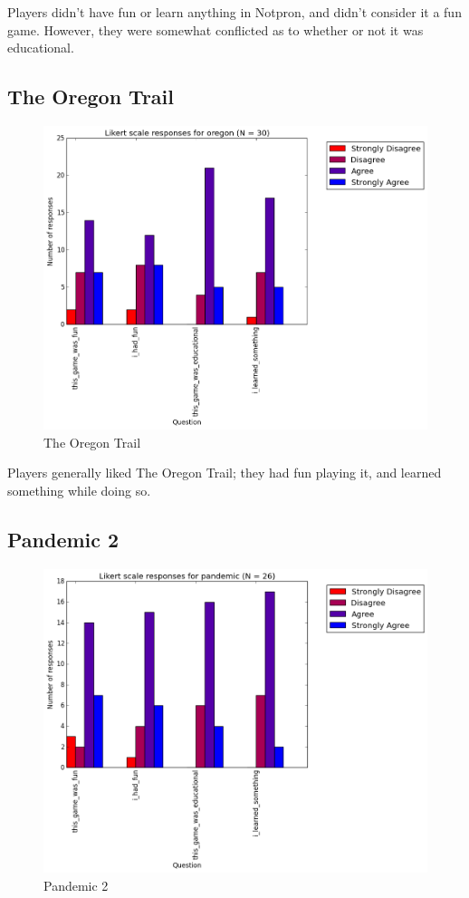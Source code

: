 				Players didn't have fun or learn anything in Notpron, and didn't consider it a fun game. However, they were somewhat conflicted as to whether or not it was educational.

			\subsection{The Oregon Trail}

				\begin{figure}[] 
				\centering 
				\includegraphics[width=\textwidth, height=.4\textheight, keepaspectratio=true]{oregon_likert.png} 
				\caption{The Oregon Trail}
				\end{figure}

				Players generally liked The Oregon Trail; they had fun playing it, and learned something while doing so.

			\subsection{Pandemic 2}

				\begin{figure}[] 
				\centering 
				\includegraphics[width=\textwidth, height=.4\textheight, keepaspectratio=true]{pandemic_likert.png} 
				\caption{Pandemic 2}
				\end{figure}

			\clearpage

